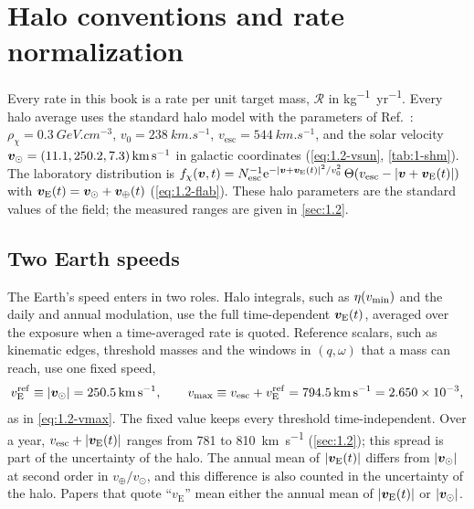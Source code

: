 \section{Halo conventions and rate normalization}\label{app:A.8}

Every rate in this book is a rate per unit target mass, $\mathcal{R}$ in \si{kg^{-1}.yr^{-1}}. Every halo average uses the standard halo model with the parameters of Ref.~\cite[Table~1]{baxter2021recommended}: $\rho_\chi = \SI{0.3}{GeV.cm^{-3}}$, $v_0 = \SI{238}{km.s^{-1}}$, $v_{\mathrm{esc}} = \SI{544}{km.s^{-1}}$, and the solar velocity $\vect{v}_\odot = (11.1, 250.2, 7.3)\,\si{km.s^{-1}}$ in galactic coordinates (\cref{eq:1.2-vsun}, \cref{tab:1-shm}). The laboratory distribution is $f_\chi(\vect{v},t) = N_{\mathrm{esc}}^{-1}\ee^{-|\vect{v}+\vect{v}_{\mathrm{E}}(t)|^2/v_0^2}\,\Theta(v_{\mathrm{esc}} - |\vect{v}+\vect{v}_{\mathrm{E}}(t)|)$ with $\vect{v}_{\mathrm{E}}(t) = \vect{v}_\odot + \vect{v}_\oplus(t)$ (\cref{eq:1.2-flab}). These halo parameters are the standard values of the field; the measured ranges are given in \cref{sec:1.2}.

\subsection{Two Earth speeds}

The Earth's speed enters in two roles. Halo integrals, such as $\eta(\vmin)$ and the daily and annual modulation, use the full time-dependent $\vect{v}_{\mathrm{E}}(t)$, averaged over the exposure when a time-averaged rate is quoted. Reference scalars, such as kinematic edges, threshold masses and the windows in $(q,\omega)$ that a mass can reach, use one fixed speed,
\begin{equation}
  v_{\mathrm{E}}^{\mathrm{ref}} \equiv |\vect{v}_\odot| = \SI{250.5}{km.s^{-1}}, \qquad
  v_{\mathrm{max}} \equiv v_{\mathrm{esc}} + v_{\mathrm{E}}^{\mathrm{ref}} = \SI{794.5}{km.s^{-1}} = 2.650\times10^{-3} ,
  \label{eq:A.8-ref}
\end{equation}
as in \cref{eq:1.2-vmax}. The fixed value keeps every threshold time-independent. Over a year, $v_{\mathrm{esc}} + |\vect{v}_{\mathrm{E}}(t)|$ ranges from 781 to \SI{810}{km.s^{-1}} (\cref{sec:1.2}); this spread is part of the uncertainty of the halo. The annual mean of $|\vect{v}_{\mathrm{E}}(t)|$ differs from $|\vect{v}_\odot|$ at second order in $v_\oplus/v_\odot$, and this difference is also counted in the uncertainty of the halo. Papers that quote ``$v_{\mathrm{E}}$'' mean either the annual mean of $|\vect{v}_{\mathrm{E}}(t)|$ or $|\vect{v}_\odot|$.


